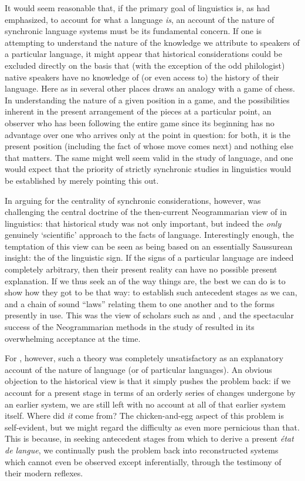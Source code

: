 It would seem reasonable that, if the primary goal of linguistics is,
as {\Saussure} had emphasized, to account for what a language \emph{is},
an account of the nature of synchronic language systems must be its
fundamental concern.  If one is attempting to understand the nature of
the knowledge we attribute to speakers of a particular language, it
might appear that historical considerations could be excluded directly
on the basis that (with the exception of the odd philologist) native
speakers have no knowledge of (or even access to) the history of their
language.  Here as in several other places {\Saussure} draws an {analogy}
with a game of chess. In understanding the nature of a given position
in a game, and the possibilities inherent in the present arrangement
of the pieces at a particular point, an observer who has been
following the entire game since its beginning has no advantage over
one who arrives only at the point in question: for both, it is the
present position (including the fact of whose move comes next) and
nothing else that matters.  The same might well seem valid in the
study of language, and one would expect that the priority of strictly
synchronic studies in linguistics would be established by merely
pointing this out.

In arguing for the centrality of synchronic considerations, however,
{\Saussure} was challenging the central doctrine of the then-current
Neogrammarian view of  in linguistics: that historical
study was not only important, but indeed the \emph{only} genuinely
`scientific' approach to the facts of language.  Interestingly enough,
the temptation of this view can be seen as being based on an
essentially Saussurean insight: the  of the linguistic
sign.  If the signs of a particular language are indeed completely
arbitrary, then their present reality can have no possible present
{explanation}.  If we thus seek an  of the way things are,
the best we can do is to show how they got to be that way: to
establish such antecedent stages as we can, and a chain of sound
``laws'' relating them to one another and to the forms presently in
use.  This was the view of scholars such as  and , and the spectacular success of the Neogrammarian methods in
the study of  resulted in its overwhelming acceptance at
the time.

For {\Saussure}, however, such a theory was completely unsatisfactory as
an explanatory account of the nature of language (or of particular
languages).  An obvious objection to the historical view is that it
simply pushes the problem back: if we account for a present stage in
terms of an orderly series of changes undergone by an earlier system,
we are still left with no account at all of that earlier system
itself.  Where did \emph{it} come from? The chicken-and-egg aspect
of this problem is self-evident, but we might regard the difficulty as
even more pernicious than that. This is because, in seeking antecedent
stages from which to derive a present \emph{état de langue}, we
continually push the problem back into reconstructed systems which
cannot even be observed except inferentially, through the testimony
of their modern reflexes.


